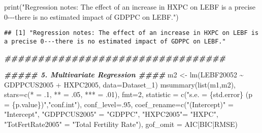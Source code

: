 \documentclass[
]{article}
\newenvironment{Shaded}{\begin{snugshade}}{\end{snugshade}}
\newcommand{\AttributeTok}[1]{\textcolor[rgb]{0.77,0.63,0.00}{#1}}
\newcommand{\DecValTok}[1]{\textcolor[rgb]{0.00,0.00,0.81}{#1}}
\newcommand{\DocumentationTok}[1]{\textcolor[rgb]{0.56,0.35,0.01}{\textbf{\textit{#1}}}}
\newcommand{\FunctionTok}[1]{\textcolor[rgb]{0.00,0.00,0.00}{#1}}
\newcommand{\NormalTok}[1]{#1}
\newcommand{\OtherTok}[1]{\textcolor[rgb]{0.56,0.35,0.01}{#1}}
\newcommand{\SpecialCharTok}[1]{\textcolor[rgb]{0.00,0.00,0.00}{#1}}
\newcommand{\StringTok}[1]{\textcolor[rgb]{0.31,0.60,0.02}{#1}}
\begin{document}
\begin{Shaded}
\begin{Highlighting}[]
\FunctionTok{print}\NormalTok{(}\StringTok{"Regression notes: The effect of an increase in HXPC on LEBF is a precise 0{-}{-}{-}there is no estimated impact of GDPPC on LEBF."}\NormalTok{)}
\end{Highlighting}
\end{Shaded}

\begin{verbatim}
## [1] "Regression notes: The effect of an increase in HXPC on LEBF is a precise 0---there is no estimated impact of GDPPC on LEBF."
\end{verbatim}

\begin{Shaded}
\begin{Highlighting}[]
\DocumentationTok{\#\#\#\#\#\#\#\#\#\#\#\#\#\#\#\#\#\#\#\#\#\#\#\#\#\#\#\#\#\#\#\#\#}


\DocumentationTok{\#\#\#\#\# 5. Multivariate Regression \#\#\#\#}
\NormalTok{m2 }\OtherTok{\textless{}{-}} \FunctionTok{lm}\NormalTok{(LEBF20052 }\SpecialCharTok{\textasciitilde{}}\NormalTok{ GDPPCUS2005 }\SpecialCharTok{+}\NormalTok{ HXPC2005, }\AttributeTok{data=}\NormalTok{Dataset\_1)}
\FunctionTok{msummary}\NormalTok{(}\FunctionTok{list}\NormalTok{(m1,m2),}
         \AttributeTok{stars=}\FunctionTok{c}\NormalTok{(}\StringTok{\textquotesingle{}*\textquotesingle{}} \OtherTok{=}\NormalTok{ .}\DecValTok{1}\NormalTok{, }\StringTok{\textquotesingle{}**\textquotesingle{}} \OtherTok{=}\NormalTok{ .}\DecValTok{05}\NormalTok{, }\StringTok{\textquotesingle{}***\textquotesingle{}} \OtherTok{=}\NormalTok{ .}\DecValTok{01}\NormalTok{),}
         \AttributeTok{fmt=}\DecValTok{2}\NormalTok{,}
         \AttributeTok{statistic =} \FunctionTok{c}\NormalTok{(}\StringTok{"s.e. = \{std.error\} (p = \{p.value\})"}\NormalTok{,}\StringTok{"conf.int"}\NormalTok{),}
         \AttributeTok{conf\_level=}\NormalTok{.}\DecValTok{95}\NormalTok{,}
         \AttributeTok{coef\_rename=}\FunctionTok{c}\NormalTok{(}\StringTok{"(Intercept)"} \OtherTok{=} \StringTok{"Intercept"}\NormalTok{, }\StringTok{"GDPPCUS2005"} \OtherTok{=} \StringTok{"GDPPC"}\NormalTok{, }\StringTok{"HXPC2005"}\OtherTok{=} \StringTok{"HXPC"}\NormalTok{, }\StringTok{"TotFertRate2005"} \OtherTok{=} \StringTok{"Total Fertility Rate"}\NormalTok{),}
         \AttributeTok{gof\_omit =} \StringTok{\textquotesingle{}AIC|BIC|RMSE\textquotesingle{}}\NormalTok{) }
\end{Highlighting}
\end{Shaded}
\end{document}
